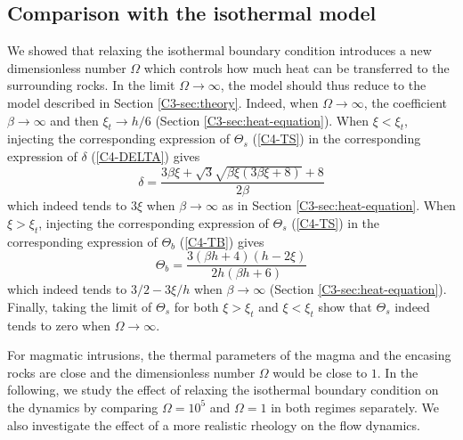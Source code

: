 \subsection{Comparison with the isothermal model}
\label{C4-sec:some-limits}

We showed that relaxing the isothermal boundary condition introduces a
new dimensionless number $\Omega$ which  controls how much heat can be
transferred    to   the    surrounding    rocks.     In   the    limit
$\Omega \rightarrow \infty$, the model should thus reduce to the model
described    in    Section    \ref{C3-sec:theory}.     Indeed,    when
$\Omega\rightarrow \infty$, the  coefficient $\beta\rightarrow \infty$
and then $\xi_t\rightarrow  h/6$ (Section \ref{C3-sec:heat-equation}).
When $\xi<\xi_t$, injecting the corresponding expression of $\Theta_s$
(\ref{C4-TS})   in   the    corresponding   expression   of   $\delta$
(\ref{C4-DELTA}) gives
\begin{equation}
  \delta =\frac{3 \beta \xi +\sqrt{3} \sqrt{\beta \xi (3 \beta \xi +8)}+8}{2 \beta }
\end{equation}
which indeed  tends to  $3\xi$ when $\beta  \rightarrow \infty$  as in
Section \ref{C3-sec:heat-equation}.   When $\xi>\xi_t$,  injecting the
corresponding   expression   of   $\Theta_s$  (\ref{C4-TS})   in   the
corresponding expression of $\Theta_b$ (\ref{C4-TB}) gives
\begin{equation}
  \Theta_b = \frac{3 (\beta  h+4) (h-2 \xi )}{2 h (\beta  h+6)}
\end{equation}
which  indeed tends  to $3/2-3\xi/h$  when $\beta  \rightarrow \infty$
(Section  \ref{C3-sec:heat-equation}). Finally,  taking  the limit  of
$\Theta_s$ for  both $\xi>\xi_t$ and $\xi<\xi_t$  show that $\Theta_s$
indeed tends to zero when $\Omega\rightarrow \infty$.

For magmatic intrusions,  the thermal parameters of the  magma and the
encasing rocks are  close and the dimensionless  number $\Omega$ would
be close to $1$. In the following, we study the effect of relaxing the
isothermal   boundary  condition   on   the   dynamics  by   comparing
$\Omega=10^5$ and  $\Omega = 1$  in both regimes separately.   We also
investigate  the effect  of  a  more realistic  rheology  on the  flow
dynamics.

